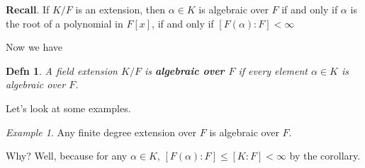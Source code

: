 \documentclass[12pt]{article}
\newtheorem{definition}{Defn}
\theoremstyle{remark}
\theoremstyle{remark}
\theoremstyle{remark}
\newtheorem{example}{Example}
\theoremstyle{remark}
\theoremstyle{remark}
\begin{document}
{\bf Recall}. If $K / F$ is an extension, then $\alpha \in K$ is algebraic over
$F$ if and only if $\alpha$ is the root of a polynomial in $F[x]$, if and only
if $[F(\alpha) : F] < \infty$

Now we have

\begin{definition}
  A field extension $K / F$ is {\bf algebraic over $F$} if every element $\alpha
  \in K$ is algebraic over $F$.
\end{definition}

Let's look at some examples.

\begin{example}
  Any finite degree extension over $F$ is algebraic over $F$.

  Why? Well, because for any $\alpha \in K$, $[F(\alpha) : F] \le [K : F] <
  \infty$ by the corollary.
\end{example}
\end{document}
